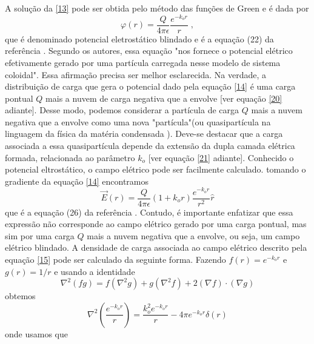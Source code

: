 \documentclass[brazilian,10.7pt,a4paper]{article}
\begin{document}
\begin{multicols}{2}
\par A solução da \eqref{13} pode ser obtida pelo método das funções de Green e é dada por 
\\
\begin{equation}\label{14}
\varphi(r)=\frac{Q}{4\pi\epsilon}\frac{e^{-k_{o}r}}{r}\;,
\end{equation}
que é denominado potencial eletrostático blindado e é a equação (22) da referência \cite{ramos}. Segundo os autores, essa equação "nos fornece o potencial elétrico efetivamente gerado por uma partícula carregada nesse modelo de sistema coloidal". Essa afirmação precisa ser melhor esclarecida. Na verdade, a distribuição de carga que gera o potencial dado pela equação \eqref{14} é uma carga pontual $Q$ mais a nuvem de carga negativa que a envolve [ver equação \eqref{20} adiante]. Desse modo, podemos considerar a partícula de carga $Q$ mais a nuvem negativa que a envolve como uma nova "partícula"(ou quasipartícula na linguagem da física da matéria condensada \cite{ribeiro}). Deve-se destacar que a carga associada a essa quasipartícula depende da extensão da dupla camada elétrica formada, relacionada ao parâmetro $k_{o}$ [ver equação \eqref{21} adiante]. Conhecido o potencial eltrostático, o campo elétrico pode ser facilmente calculado. tomando o gradiente da equação \eqref{14} encontramos
\\
\begin{equation}\label{15}
\vec{E}(r)=\frac{Q}{4\pi\epsilon}(1+k_{o}r)\frac{e^{-k_{o}r}}{r^{2}}\hat{r}
\end{equation}
que é a equação (26) da referência \cite{ramos}. Contudo, é importante enfatizar que essa expressão não corresponde ao campo elétrico gerado por uma carga pontual, mas sim por uma carga $Q$ mais a nuvem negativa que a envolve, ou seja, um campo elétrico blindado. A densidade de carga associada ao campo elétrico descrito pela equação \eqref{15} pode ser calculado da seguinte forma. Fazendo $f(r)=e^{-k_{o}r}$ e $g(r) = 1/r$ e usando a identidade
\\
\begin{equation}\label{16}
\nabla^{2}(fg)=f(\nabla^{2}g)+g(\nabla^{2}f)+2(\nabla f)\cdot(\nabla g)
\end{equation}
obtemos
\\
\begin{equation}\label{17}
\nabla^{2}\left(\frac{e^{-k_{o}r}}{r}\right)=\frac{k^{2}_{o}e^{-k_{o}r}}{r}-4\pi e^{-k_{o}r}\delta(r)
\end{equation}
onde usamos que
\\

\end{multicols}
\end{document}
